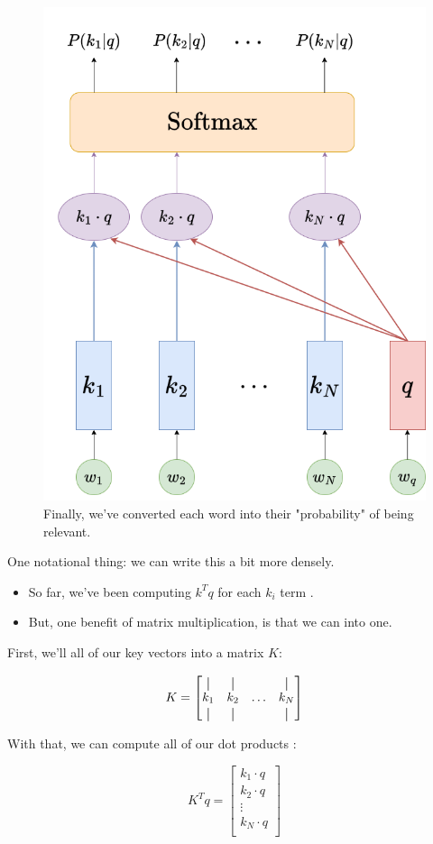         \begin{figure}[H]
            \centering
            \includegraphics[width=0.3\linewidth]{images/transformers_images/softmax_attention.png}
            \caption*{Finally, we've converted each word into their "probability" of being relevant.}
        \end{figure}

        One notational thing: we can write this a bit more densely.

        \begin{itemize}
            \item So far, we've been computing $k^Tq$ for each $k_i$ term .

            \item But, one benefit of matrix multiplication, is that we can  into one.
        \end{itemize}

        First, we'll  all of our key vectors into a matrix $K$:

        \begin{equation}
            K = 
            \begin{bmatrix}
                \vertbar & \vertbar  & \     & \vertbar \\
                k_1 & k_2 & \ldots & k_N \\
                \vertbar & \vertbar  &        & \vertbar
            \end{bmatrix}
        \end{equation}

        With that, we can compute all of our dot products :

        \begin{equation}
            K^Tq = 
            \begin{bmatrix}
                k_1 \cdot q \\ k_2 \cdot q \\ \vdots \\ k_N \cdot q \\
            \end{bmatrix}
        \end{equation}

